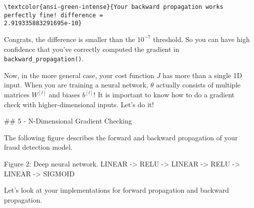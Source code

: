 \documentclass[11pt]{article}
\begin{document}
    \begin{Verbatim}[commandchars=\\\{\}]
\textcolor{ansi-green-intense}{Your backward propagation works perfectly fine! difference =
2.919335883291695e-10}
    \end{Verbatim}

    Congrats, the difference is smaller than the \(10^{-7}\) threshold. So
you can have high confidence that you've correctly computed the gradient
in \texttt{backward\_propagation()}.

Now, in the more general case, your cost function \(J\) has more than a
single 1D input. When you are training a neural network, \(\theta\)
actually consists of multiple matrices \(W^{[l]}\) and biases
\(b^{[l]}\)! It is important to know how to do a gradient check with
higher-dimensional inputs. Let's do it!

    \#\# 5 - N-Dimensional Gradient Checking

    The following figure describes the forward and backward propagation of
your fraud detection model.

Figure 2: Deep neural network. LINEAR -\textgreater{} RELU
-\textgreater{} LINEAR -\textgreater{} RELU -\textgreater{} LINEAR
-\textgreater{} SIGMOID

Let's look at your implementations for forward propagation and backward
propagation.
\end{document}
